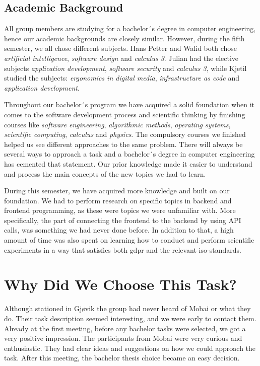 \subsection{Academic Background}
\label{section:academic background}
All group members are studying for a bachelor´s degree in computer engineering, hence our academic backgrounds are closely similar. However, during the fifth semester, we all chose different subjects. Hans Petter and Walid both chose \textit{artificial intelligence}, \textit{software design} and \textit{calculus 3}. Julian had the elective subjects \textit{application development}, \textit{software security} and \textit{calculus 3}, while Kjetil studied the subjects: \textit{ergonomics in digital media}, \textit{infrastructure as code} and \textit{application development}. 

Throughout our bachelor´s program we have acquired a solid foundation when it comes to the software development process and scientific thinking by finishing courses like \textit{software engineering}, \textit{algorithmic methods}, \textit{operating systems}, \textit{scientific computing}, \textit{calculus} and \textit{physics}. The compulsory courses we finished helped us see different approaches to the same problem. There will always be several ways to approach a task and a bachelor´s degree in computer engineering has cemented that statement. Our prior knowledge made it easier to understand and process the main concepts of the new topics we had to learn. 

During this semester, we have acquired more knowledge and built on our foundation. We had to perform research on specific topics in backend and frontend programming, as these were topics we were unfamiliar with. More specifically, the part of connecting the frontend to the backend by using API calls, was something we had never done before. In addition to that, a high amount of time was also spent on learning how to conduct and perform scientific experiments in a way that satisfies both \acrfull{gdpr} and the relevant \acrshort{iso}-standards.  

\section{Why Did We Choose This Task?}
Although stationed in Gjøvik the group had never heard of Mobai or what they do. Their task description seemed interesting, and we were early to contact them. Already at the first meeting, before any bachelor tasks were selected, we got a very positive impression. The participants from Mobai were very curious and enthusiastic. They had clear ideas and suggestions on how we could approach the task. After this meeting, the bachelor thesis choice became an easy decision. 

